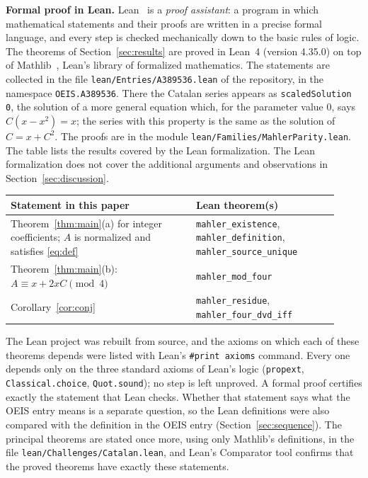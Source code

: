 \documentclass[11pt,a4paper]{article}
\theoremstyle{definition}
\theoremstyle{remark}
\newcommand{\para}[1]{\par\medskip\noindent\textbf{#1}\enspace}
\begin{document}
\para{Formal proof in Lean.}
Lean~\cite{lean} is a \emph{proof assistant}: a program in which mathematical statements and their proofs are written
in a precise formal language, and every step is checked mechanically down to the basic rules of logic. The theorems of Section~\ref{sec:results} are proved in Lean~4 (version 4.35.0) on top of
Mathlib~\cite{mathlib}, Lean's library of formalized mathematics. The statements are collected in the file \texttt{lean/Entries/A389536.lean} of the repository,
in the namespace \texttt{OEIS.A389536}. There the Catalan series appears as \texttt{scaledSolution 0}, the solution of a more general equation which, for the parameter value $0$, says $C(x-x^2)=x$; the series with this property is the same as the solution of $C=x+C^2$. The proofs are in the module \texttt{lean/Families/MahlerParity.lean}.
The table lists the results covered by the Lean formalization. The Lean formalization does not cover the additional arguments and observations in Section~\ref{sec:discussion}.
\begin{center}\small\renewcommand{\arraystretch}{1.25}
\begin{tabular}{>{\raggedright\arraybackslash}p{0.52\linewidth}>{\raggedright\arraybackslash}p{0.4\linewidth}}
\toprule
Statement in this paper & Lean theorem(s)\\
\midrule
Theorem~\ref{thm:main}(a) for integer coefficients; $A$ is normalized and satisfies \eqref{eq:def} & \texttt{mahler\_\allowbreak{}existence}, \texttt{mahler\_\allowbreak{}definition}, \texttt{mahler\_\allowbreak{}source\_\allowbreak{}unique} \\
Theorem~\ref{thm:main}(b): $A\equiv x+2xC\pmod4$ & \texttt{mahler\_\allowbreak{}mod\_\allowbreak{}four} \\
Corollary~\ref{cor:conj} & \texttt{mahler\_\allowbreak{}residue}, \texttt{mahler\_\allowbreak{}four\_\allowbreak{}dvd\_\allowbreak{}iff} \\
\bottomrule
\end{tabular}
\end{center}
The Lean project was rebuilt from source, and the axioms on which each of these theorems depends were listed with
Lean's \texttt{\#print axioms} command. Every one depends only on the three standard axioms of Lean's logic
(\texttt{propext}, \texttt{Classical.choice}, \texttt{Quot.sound}); no step is left unproved. A formal proof certifies
exactly the statement that Lean checks. Whether that statement says what the OEIS entry means is a separate question,
so the Lean definitions were also compared with the definition in the OEIS entry
(Section~\ref{sec:sequence}). The principal theorems are stated once more, using only Mathlib's definitions, in the
file \texttt{lean/Challenges/Catalan.lean}, and Lean's Comparator tool confirms that the
proved theorems have exactly these statements.
\end{document}
